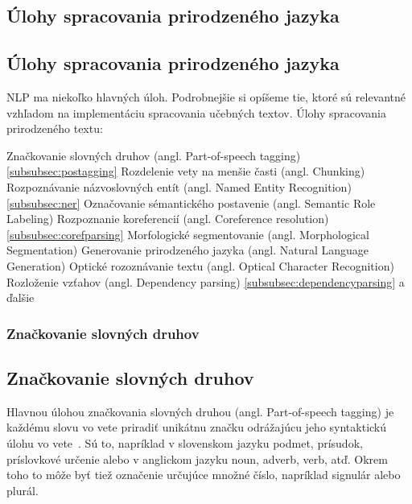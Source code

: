 %
%
{
	\subsection{Úlohy spracovania prirodzeného jazyka}
}
{
	\subsection{Úlohy spracovania prirodzeného jazyka}
}
\label{subsec:tasksofnlp}
NLP ma niekoľko hlavných úloh. Podrobnejšie si opíšeme tie, ktoré sú relevantné vzhľadom na implementáciu spracovania učebných textov.
Úlohy spracovania prirodzeného textu:~\cite{collobert2011} 
\begin{my_itemize}
	\myitem Značkovanie slovných druhov (angl. Part-of-speech tagging) \ref{subsubsec:postagging}
	\myitem Rozdelenie vety na menšie časti (angl. Chunking)
	\myitem Rozpoznávanie názvoslovných entít (angl. Named Entity Recognition) \ref{subsubsec:ner}
	\myitem Označovanie sémantického postavenie (angl. Semantic Role Labeling)
	\myitem Rozpoznanie koreferencií (angl. Coreference resolution) \ref{subsubsec:corefparsing}
	\myitem Morfologické segmentovanie (angl. Morphological Segmentation)
	\myitem Generovanie prirodzeného jazyka (angl. Natural Language Generation)
	\myitem Optické rozoznávanie textu (angl. Optical Character Recognition)
	\myitem Rozloženie vzťahov (angl. Dependency parsing) \ref{subsubsec:dependencyparsing}
	\myitem a ďalšie
\end{my_itemize}

%
%
{
	\subsubsection{Značkovanie slovných druhov}
}
{
	\subsection{Značkovanie slovných druhov}
}
\label{subsubsec:postagging}
Hlavnou úlohou značkovania slovných druhou (angl. Part-of-speech tagging) je každému slovu vo vete priradiť unikátnu značku odrážajúcu jeho syntaktickú úlohu vo vete~\cite{collobert2011}. Sú to, napríklad v slovenskom jazyku podmet, prísudok, príslovkové určenie alebo v anglickom jazyku noun, adverb, verb, atď. Okrem toho to môže byť tiež označenie určujúce množné číslo, napríklad signulár alebo plurál.

